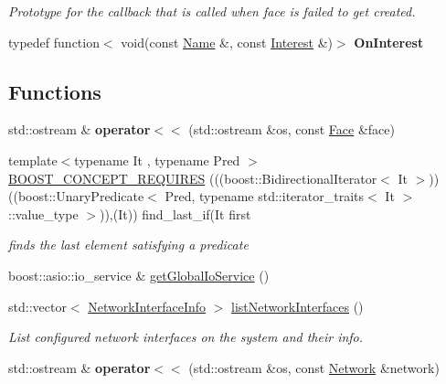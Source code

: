\begin{DoxyCompactItemize}
\begin{DoxyCompactList}\small\item\em Prototype for the callback that is called when face is failed to get created. \end{DoxyCompactList}\item 
typedef function$<$ void(const \hyperlink{classndn_1_1Name}{Name} \&, const \hyperlink{classndn_1_1Interest}{Interest} \&)$>$ {\bfseries On\+Interest}\hypertarget{namespacenfd_a53e9348a2bd05dcb3db25ae210e178fd}{}\label{namespacenfd_a53e9348a2bd05dcb3db25ae210e178fd}

\end{DoxyCompactItemize}
\subsection*{Functions}
\begin{DoxyCompactItemize}
\item 
std\+::ostream \& {\bfseries operator$<$$<$} (std\+::ostream \&os, const \hyperlink{classnfd_1_1Face}{Face} \&face)\hypertarget{namespacenfd_a3e3d16a169b926469f38420357140d71}{}\label{namespacenfd_a3e3d16a169b926469f38420357140d71}

\item 
{\footnotesize template$<$typename It , typename Pred $>$ }\\\hyperlink{namespacenfd_a4faa4d523aa57c9bd3eb7c81b4dc9253}{B\+O\+O\+S\+T\+\_\+\+C\+O\+N\+C\+E\+P\+T\+\_\+\+R\+E\+Q\+U\+I\+R\+ES} (((boost\+::\+Bidirectional\+Iterator$<$ It $>$))((boost\+::\+Unary\+Predicate$<$ Pred, typename std\+::iterator\+\_\+traits$<$ It $>$\+::value\+\_\+type $>$)),(It)) find\+\_\+last\+\_\+if(It first
\begin{DoxyCompactList}\small\item\em finds the last element satisfying a predicate \end{DoxyCompactList}\item 
boost\+::asio\+::io\+\_\+service \& \hyperlink{namespacenfd_a32b45c73eeaab44392989dfc2c5abea8}{get\+Global\+Io\+Service} ()
\item 
std\+::vector$<$ \hyperlink{classnfd_1_1NetworkInterfaceInfo}{Network\+Interface\+Info} $>$ \hyperlink{namespacenfd_a2e68af836fb34de1295b58022d76c9b1}{list\+Network\+Interfaces} ()
\begin{DoxyCompactList}\small\item\em List configured network interfaces on the system and their info. \end{DoxyCompactList}\item 
std\+::ostream \& {\bfseries operator$<$$<$} (std\+::ostream \&os, const \hyperlink{classnfd_1_1Network}{Network} \&network)\hypertarget{namespacenfd_a8d6f47b1d076c85dfc8effb052ddb44d}{}\label{namespacenfd_a8d6f47b1d076c85dfc8effb052ddb44d}


\end{DoxyCompactItemize}
